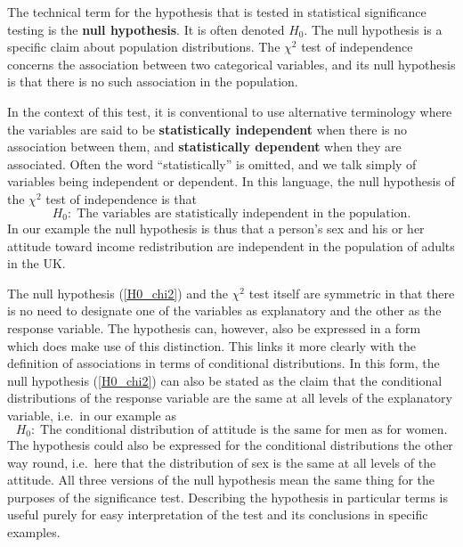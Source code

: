 The technical term for the hypothesis that is tested in statistical
significance testing is the \textbf{null hypothesis}. It is often
denoted $H_{0}$. The null hypothesis is a specific claim about
population distributions. The $\chi^{2}$ test of independence concerns
the association between two categorical variables, and its null
hypothesis is that there is no such association in the population.

In
the context of this test, it is conventional to use alternative
terminology where the variables are said to be \textbf{statistically
independent} when there is no association between them, and
\textbf{statistically dependent} when they are associated. Often the
word ``statistically'' is omitted, and we talk simply of
variables being independent or dependent. In this language, the null
hypothesis of the $\chi^{2}$ test of independence is that
\begin{equation}
H_{0}: \;\text{The variables are statistically independent in the
population}.
\label{H0_chi2}
\end{equation}
In our example the null hypothesis is thus that a person's sex and his
or her attitude toward income redistribution are independent in the
population of adults in the UK.

The null hypothesis (\ref{H0_chi2}) and the $\chi^{2}$ test itself are
symmetric in that there is no need to designate one of the
variables as explanatory and the other as the response variable. The
hypothesis can, however, also be expressed in a form which does make use
of this distinction. This links it more clearly with the definition of
associations in terms of conditional
distributions. In this form, the null
hypothesis (\ref{H0_chi2}) can also be stated as the claim that the
conditional distributions of the response variable are the same at
all levels of the explanatory variable, i.e.\ in our example as
\[
H_{0}: \;\text{The conditional distribution of attitude is the same for
men as for women}.
\]
The hypothesis could also be expressed for the conditional distributions
the other way round, i.e.\ here that the distribution of sex is the same
at all levels of the attitude. All three versions of the null hypothesis
mean the same thing for the purposes of the significance test.
Describing the hypothesis in particular terms is useful purely for easy
interpretation of the test and its conclusions in specific examples.

